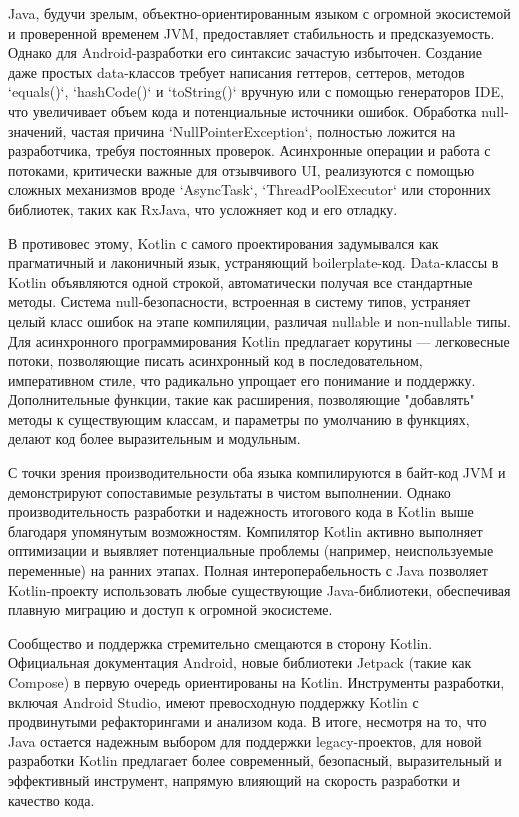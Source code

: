 Java, будучи зрелым, объектно-ориентированным языком с огромной экосистемой и проверенной временем JVM, предоставляет стабильность и предсказуемость. Однако для Android-разработки его синтаксис зачастую избыточен. Создание даже простых data-классов требует написания геттеров, сеттеров, методов `equals()`, `hashCode()` и `toString()` вручную или с помощью генераторов IDE, что увеличивает объем кода и потенциальные источники ошибок. Обработка null-значений, частая причина `NullPointerException`, полностью ложится на разработчика, требуя постоянных проверок. Асинхронные операции и работа с потоками, критически важные для отзывчивого UI, реализуются с помощью сложных механизмов вроде `AsyncTask`, `ThreadPoolExecutor` или сторонних библиотек, таких как RxJava, что усложняет код и его отладку.

В противовес этому, Kotlin с самого проектирования задумывался как прагматичный и лаконичный язык, устраняющий boilerplate-код. Data-классы в Kotlin объявляются одной строкой, автоматически получая все стандартные методы. Система null-безопасности, встроенная в систему типов, устраняет целый класс ошибок на этапе компиляции, различая nullable и non-nullable типы. Для асинхронного программирования Kotlin предлагает корутины — легковесные потоки, позволяющие писать асинхронный код в последовательном, императивном стиле, что радикально упрощает его понимание и поддержку. Дополнительные функции, такие как расширения, позволяющие "добавлять" методы к существующим классам, и параметры по умолчанию в функциях, делают код более выразительным и модульным. \cite{refc}

С точки зрения производительности оба языка компилируются в байт-код JVM и демонстрируют сопоставимые результаты в чистом выполнении. Однако производительность разработки и надежность итогового кода в Kotlin выше благодаря упомянутым возможностям. Компилятор Kotlin активно выполняет оптимизации и выявляет потенциальные проблемы (например, неиспользуемые переменные) на ранних этапах. Полная интероперабельность с Java позволяет Kotlin-проекту использовать любые существующие Java-библиотеки, обеспечивая плавную миграцию и доступ к огромной экосистеме.

Сообщество и поддержка стремительно смещаются в сторону Kotlin. Официальная документация Android, новые библиотеки Jetpack (такие как Compose) в первую очередь ориентированы на Kotlin. Инструменты разработки, включая Android Studio, имеют превосходную поддержку Kotlin с продвинутыми рефакторингами и анализом кода. В итоге, несмотря на то, что Java остается надежным выбором для поддержки legacy-проектов, для новой разработки Kotlin предлагает более современный, безопасный, выразительный и эффективный инструмент, напрямую влияющий на скорость разработки и качество кода. \cite{refc,refd}

